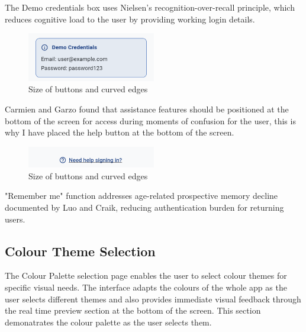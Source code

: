 \documentclass[]{project_final}
\begin{document}
The Demo credentials box uses Nielsen's recognition-over-recall principle, which reduces cognitive load to the user by providing working login details.

\begin{figure}[ht!]
    \centering
    \includegraphics[width=0.5\textwidth]{M Demo cred.png}
    \caption{Size of buttons and curved edges}
    \label{fig:1}
\end{figure}

Carmien and Garzo found that assistance features should be positioned at the bottom of the screen for access during moments of confusion for the user, this is why I have placed the help button at the bottom of the screen.

\begin{figure}[ht!]
    \centering
    \includegraphics[width=0.5\textwidth]{M Help Button.png}
    \caption{Size of buttons and curved edges}
    \label{fig:1}
\end{figure}

"Remember me" function addresses age-related prospective memory decline documented by Luo and Craik, reducing authentication burden for returning users.

\subsection{Colour Theme Selection}
The Colour Palette selection page enables the user to select colour themes for specific visual needs. The interface adapts the colours of the whole app as the user selects different themes and also provides immediate visual feedback through the real time preview section at the bottom of the screen. This section demonatrates the colour palette as the user selects them.
\end{document}
